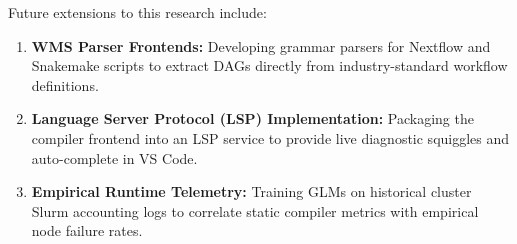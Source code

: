 \documentclass[12pt,a4paper]{article}
\begin{document}
Future extensions to this research include:
\begin{enumerate}
    \item \textbf{WMS Parser Frontends:} Developing grammar parsers for Nextflow and Snakemake scripts to extract DAGs directly from industry-standard workflow definitions.
    \item \textbf{Language Server Protocol (LSP) Implementation:} Packaging the compiler frontend into an LSP service to provide live diagnostic squiggles and auto-complete in VS Code.
    \item \textbf{Empirical Runtime Telemetry:} Training GLMs on historical cluster Slurm accounting logs to correlate static compiler metrics with empirical node failure rates.
\end{enumerate}

\newpage
\end{document}

